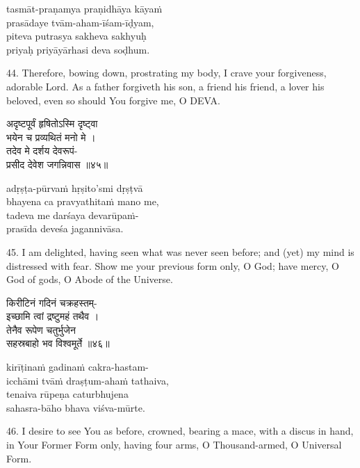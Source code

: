 \begin{transliteration}
tasmāt-praṇamya praṇidhāya kāyaṁ \\
\tab prasādaye tvām-aham-īśam-īḍyam, \\
piteva putrasya sakheva sakhyuḥ \\
\tab priyaḥ priyāyārhasi deva soḍhum.
\end{transliteration}

44. Therefore, bowing down, prostrating my body, I crave your forgiveness,
adorable Lord. As a father forgiveth his son, a friend his friend, a lover his
beloved, even so should You forgive me, O DEVA.\@

\begin{gitaverse}
अदृष्टपूर्वं हृषितोऽस्मि दृष्ट्वा \\
\tab भयेन च प्रव्यथितं मनो मे । \\
तदेव मे दर्शय देवरूपं- \\
\tab प्रसीद देवेश जगन्निवास ॥४५॥
\end{gitaverse}

\begin{transliteration}
adṛṣṭa-pūrvaṁ hṛṣito'smi dṛṣṭvā \\
\tab bhayena ca pravyathitaṁ mano me, \\
tadeva me darśaya devarūpaṁ- \\
\tab prasīda deveśa jagannivāsa.
\end{transliteration}

45. I am delighted, having seen what was never seen before; and (yet) my mind
is distressed with fear. Show me your previous form only, O God; have mercy, O
God of gods, O Abode of the Universe.

\begin{gitaverse}
किरीटिनं गदिनं चक्रहस्तम्- \\
\tab इच्छामि त्वां द्रष्टुमहं तथैव । \\
तेनैव रूपेण चतुर्भुजेन \\
\tab सहस्रबाहो भव विश्वमूर्ते ॥४६॥
\end{gitaverse}

\begin{transliteration}
kirīṭinaṁ gadinaṁ cakra-hastam- \\
\tab icchāmi tvāṁ draṣṭum-ahaṁ tathaiva, \\
tenaiva rūpeṇa caturbhujena \\
\tab sahasra-bāho bhava viśva-mūrte.
\end{transliteration}

46. I desire to see You as before, crowned, bearing a mace, with a discus in
hand, in Your Former Form only, having four arms, O Thousand-armed, O Universal
Form.

